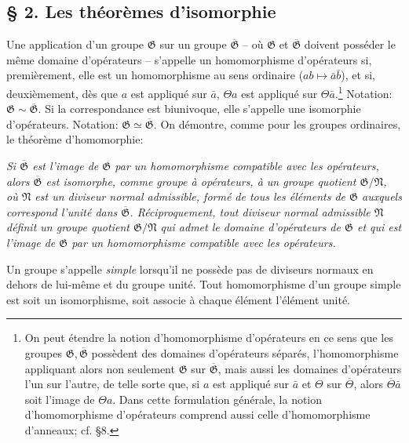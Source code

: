 
\providecommand{\mG}{\mathfrak{G}}
\providecommand{\mA}{\mathfrak{A}}
\providecommand{\mB}{\mathfrak{B}}
\providecommand{\mN}{\mathfrak{N}}
\providecommand{\mo}{\mathfrak{o}}

\subsection*{\S{} 2. Les théorèmes d'isomorphie}

Une application d'un groupe $\mG$ sur un groupe $\overline{\mG}$ -- où $\mG$ et $\overline{\mG}$ doivent posséder le même domaine d'opérateurs -- s'appelle un homomorphisme d'opérateurs si, premièrement, elle est un homomorphisme au sens ordinaire ($ab\mapsto \bar a\bar b$), et si, deuxièmement, dès que $a$ est appliqué sur $\bar a$, $\Theta a$ est appliqué sur $\Theta\bar a$.\footnote{On peut étendre la notion d'homomorphisme d'opérateurs en ce sens que les groupes $\mG,\overline{\mG}$ possèdent des domaines d'opérateurs séparés, l'homomorphisme appliquant alors non seulement $\mG$ sur $\overline{\mG}$, mais aussi les domaines d'opérateurs l'un sur l'autre, de telle sorte que, si $a$ est appliqué sur $\bar a$ et $\Theta$ sur $\overline\Theta$, alors $\overline\Theta\bar a$ soit l'image de $\Theta a$. Dans cette formulation générale, la notion d'homomorphisme d'opérateurs comprend aussi celle d'homomorphisme d'anneaux; cf. \S{}8.} Notation: $\mG\sim\overline{\mG}$. Si la correspondance est biunivoque, elle s'appelle une isomorphie d'opérateurs. Notation: $\mG\simeq\overline{\mG}$. On démontre, comme pour les groupes ordinaires, le théorème d'homomorphie:

\emph{Si $\overline{\mG}$ est l'image de $\mG$ par un homomorphisme compatible avec les opérateurs, alors $\overline{\mG}$ est isomorphe, comme groupe à opérateurs, à un groupe quotient $\mG/\mN$, où $\mN$ est un diviseur normal admissible, formé de tous les éléments de $\mG$ auxquels correspond l'unité dans $\overline{\mG}$. Réciproquement, tout diviseur normal admissible $\mN$ définit un groupe quotient $\mG/\mN$ qui admet le domaine d'opérateurs de $\mG$ et qui est l'image de $\mG$ par un homomorphisme compatible avec les opérateurs.}

Un groupe s'appelle \emph{simple} lorsqu'il ne possède pas de diviseurs normaux en dehors de lui-même et du groupe unité. Tout homomorphisme d'un groupe simple est soit un isomorphisme, soit associe à chaque élément l'élément unité.

